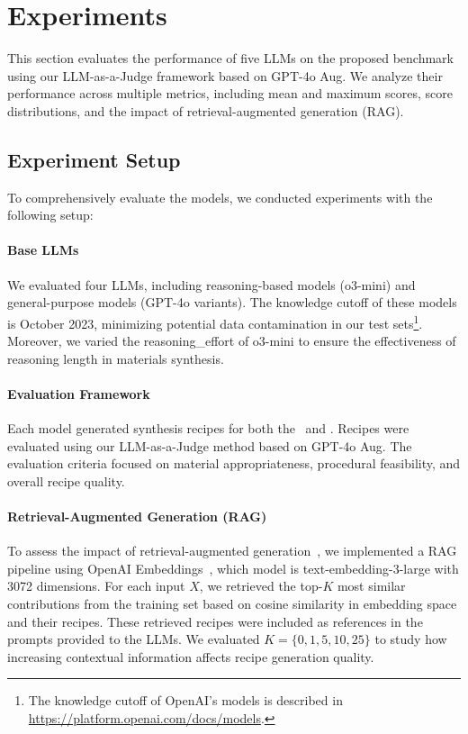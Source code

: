 \section{Experiments}
\label{sec:experiment}

This section evaluates the performance of five LLMs on the proposed benchmark using our LLM-as-a-Judge framework based on GPT-4o Aug. We analyze their performance across multiple metrics, including mean and maximum scores, score distributions, and the impact of retrieval-augmented generation (RAG).

\subsection{Experiment Setup}
\label{subsec:experiment_setup}

To comprehensively evaluate the models, we conducted experiments with the following setup:

\paragraph*{Base LLMs}
We evaluated four LLMs, including reasoning-based models (o3-mini) and general-purpose models (GPT-4o variants). The knowledge cutoff of these models is October 2023, minimizing potential data contamination in our test sets\footnote{The knowledge cutoff of OpenAI's models is described in \url{https://platform.openai.com/docs/models}.}. Moreover, we varied the reasoning\_effort of o3-mini to ensure the effectiveness of reasoning length in materials synthesis.

\paragraph*{Evaluation Framework}
Each model generated synthesis recipes for both the \testhi~and \testsi. Recipes were evaluated using our LLM-as-a-Judge method based on GPT-4o Aug. The evaluation criteria focused on material appropriateness, procedural feasibility, and overall recipe quality.
\paragraph*{Retrieval-Augmented Generation (RAG)}
To assess the impact of retrieval-augmented generation~\cite{lewis2020retrieval}, we implemented a RAG pipeline using OpenAI Embeddings~\cite{OpenAIEmbeedings2022}, which model is text-embedding-3-large with 3072 dimensions. For each input \(X\), we retrieved the top-\(K\) most similar contributions from the training set based on cosine similarity in embedding space and their recipes. These retrieved recipes were included as references in the prompts provided to the LLMs. We evaluated \(K = \{0, 1, 5, 10, 25\}\) to study how increasing contextual information affects recipe generation quality.

